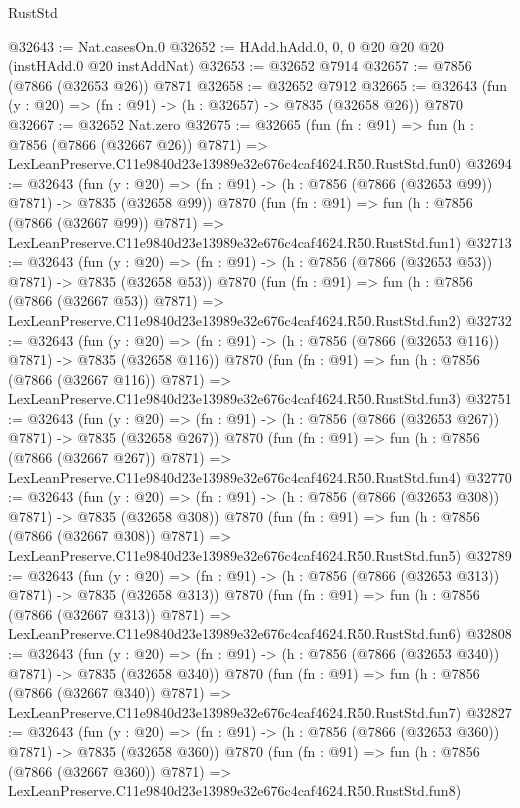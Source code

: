 \begin{lexlean}{RustStd}
\begin{coremodule}
@32643 := Nat.casesOn.{0}
@32652 := HAdd.hAdd.{0, 0, 0} @20 @20 @20 (instHAdd.{0} @20 instAddNat)
@32653 := @32652 @7914
@32657 := @7856 (@7866 (@32653 @26)) @7871
@32658 := @32652 @7912
@32665 := @32643 (fun (y : @20) => (fn : @91) -> (h : @32657) -> @7835 (@32658 @26)) @7870
@32667 := @32652 Nat.zero
@32675 := @32665
    (fun (fn : @91) =>
    fun (h : @7856 (@7866 (@32667 @26)) @7871) =>
    LexLeanPreserve.C11e9840d23e13989e32e676c4caf4624.R50.RustStd.fun0)
@32694 := @32643
    (fun (y : @20) => (fn : @91) -> (h : @7856 (@7866 (@32653 @99)) @7871) -> @7835 (@32658 @99))
    @7870
    (fun (fn : @91) =>
    fun (h : @7856 (@7866 (@32667 @99)) @7871) =>
    LexLeanPreserve.C11e9840d23e13989e32e676c4caf4624.R50.RustStd.fun1)
@32713 := @32643
    (fun (y : @20) => (fn : @91) -> (h : @7856 (@7866 (@32653 @53)) @7871) -> @7835 (@32658 @53))
    @7870
    (fun (fn : @91) =>
    fun (h : @7856 (@7866 (@32667 @53)) @7871) =>
    LexLeanPreserve.C11e9840d23e13989e32e676c4caf4624.R50.RustStd.fun2)
@32732 := @32643
    (fun (y : @20) => (fn : @91) -> (h : @7856 (@7866 (@32653 @116)) @7871) -> @7835 (@32658 @116))
    @7870
    (fun (fn : @91) =>
    fun (h : @7856 (@7866 (@32667 @116)) @7871) =>
    LexLeanPreserve.C11e9840d23e13989e32e676c4caf4624.R50.RustStd.fun3)
@32751 := @32643
    (fun (y : @20) => (fn : @91) -> (h : @7856 (@7866 (@32653 @267)) @7871) -> @7835 (@32658 @267))
    @7870
    (fun (fn : @91) =>
    fun (h : @7856 (@7866 (@32667 @267)) @7871) =>
    LexLeanPreserve.C11e9840d23e13989e32e676c4caf4624.R50.RustStd.fun4)
@32770 := @32643
    (fun (y : @20) => (fn : @91) -> (h : @7856 (@7866 (@32653 @308)) @7871) -> @7835 (@32658 @308))
    @7870
    (fun (fn : @91) =>
    fun (h : @7856 (@7866 (@32667 @308)) @7871) =>
    LexLeanPreserve.C11e9840d23e13989e32e676c4caf4624.R50.RustStd.fun5)
@32789 := @32643
    (fun (y : @20) => (fn : @91) -> (h : @7856 (@7866 (@32653 @313)) @7871) -> @7835 (@32658 @313))
    @7870
    (fun (fn : @91) =>
    fun (h : @7856 (@7866 (@32667 @313)) @7871) =>
    LexLeanPreserve.C11e9840d23e13989e32e676c4caf4624.R50.RustStd.fun6)
@32808 := @32643
    (fun (y : @20) => (fn : @91) -> (h : @7856 (@7866 (@32653 @340)) @7871) -> @7835 (@32658 @340))
    @7870
    (fun (fn : @91) =>
    fun (h : @7856 (@7866 (@32667 @340)) @7871) =>
    LexLeanPreserve.C11e9840d23e13989e32e676c4caf4624.R50.RustStd.fun7)
@32827 := @32643
    (fun (y : @20) => (fn : @91) -> (h : @7856 (@7866 (@32653 @360)) @7871) -> @7835 (@32658 @360))
    @7870
    (fun (fn : @91) =>
    fun (h : @7856 (@7866 (@32667 @360)) @7871) =>
    LexLeanPreserve.C11e9840d23e13989e32e676c4caf4624.R50.RustStd.fun8)

\end{coremodule}
\end{lexlean}
